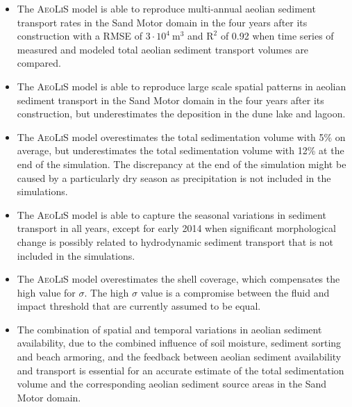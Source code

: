 \begin{itemize}
\item The \textsc{AeoLiS} model is able to reproduce multi-annual
  aeolian sediment transport rates in the Sand Motor domain in the
  four years after its construction with a RMSE of
  $3 \cdot 10^4 ~ \mathrm{m^3}$ and $\mathrm{R^2}$ of 0.92 when time
  series of measured and modeled total aeolian sediment transport
  volumes are compared.
\item The \textsc{AeoLiS} model is able to reproduce large scale
  spatial patterns in aeolian sediment transport in the Sand Motor
  domain in the four years after its construction, but underestimates
  the deposition in the dune lake and lagoon.
\item The \textsc{AeoLiS} model overestimates the total sedimentation
  volume with 5\% on average, but underestimates the total
  sedimentation volume with 12\% at the end of the simulation. The
  discrepancy at the end of the simulation might be caused by a
  particularly dry season as precipitation is not included in the
  simulations.
\item The \textsc{AeoLiS} model is able to capture the seasonal
  variations in sediment transport in all years, except for early 2014
  when significant morphological change is possibly related to
  hydrodynamic sediment transport that is not included in the
  simulations.
\item The \textsc{AeoLiS} model overestimates the shell coverage,
  which compensates the high value for $\sigma$. The high $\sigma$
  value is a compromise between the fluid and impact threshold that
  are currently assumed to be equal.
\item The combination of spatial and temporal variations in aeolian
  sediment availability, due to the combined influence of soil
  moisture, sediment sorting and beach armoring, and the feedback
  between aeolian sediment availability and transport is essential for
  an accurate estimate of the total sedimentation volume and the
  corresponding aeolian sediment source areas in the Sand Motor
  domain.
\end{itemize}

